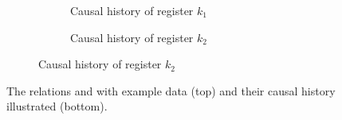 \begin{figure}[htpb]
	\begin{subfigure}[b]{\textwidth}
		\centering
		\def\dist{15pt}
		\begin{subfigure}[b]{0.45\textwidth}
			\centering
			\caption{Causal history of register \(k_1\)}\label{fig:causal-history-k1}
		\end{subfigure}
		\hspace{1em}
		\begin{subfigure}[b]{0.45\textwidth}
			\centering
			\caption{Causal history of register \(k_2\)}\label{fig:causal-history-k2}
		\end{subfigure}
	\end{subfigure}

	\caption{
		The relations  and  with example data (top)
		and their causal history illustrated (bottom).
	}\label{fig:mvr-store-relations}
\end{figure}
